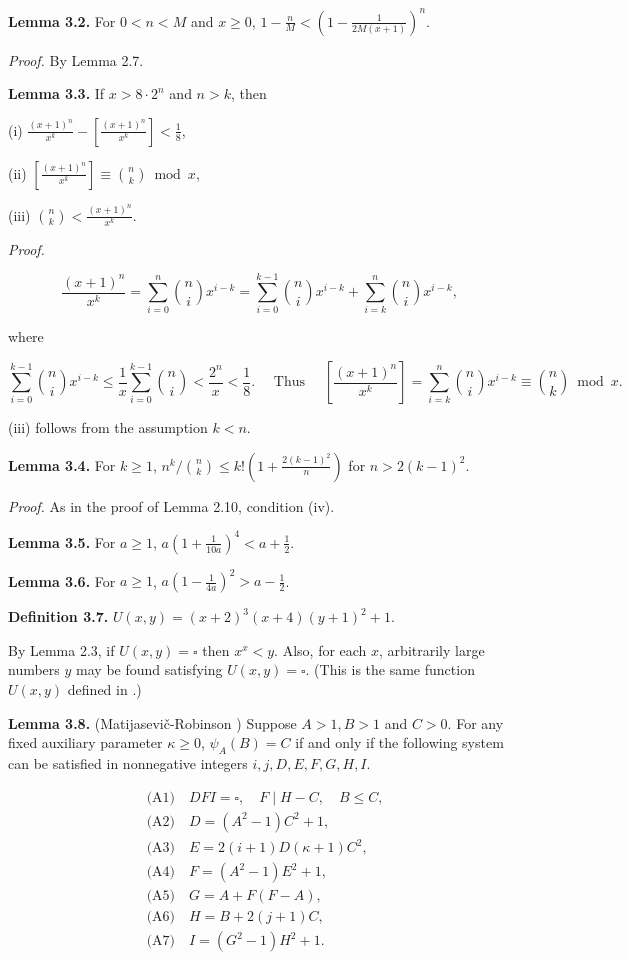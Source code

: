 \documentclass[10pt,letterpaper]{article}
\newcommand{\origpage}[1]{\marginnote{\footnotesize\textbf{[#1]}}}
\newcommand{\statement}[1]{\par\medskip\noindent\textbf{#1}\enspace}
\begin{document}
\statement{Lemma 3.2.} \origpage{456}For $0<n<M$ and $x\geq0$, $1-\frac{n}{M}<\left(1-\frac{1}{2M(x+1)}\right)^n$.

\textit{Proof.} By Lemma 2.7.

\statement{Lemma 3.3.} If $x>8 \cdot 2^{n}$ and $n>k$, then

(i) $\frac{(x+1)^{n}}{x^{k}}-\left[\frac{(x+1)^{n}}{x^{k}}\right]<\frac{1}{8}$,

(ii) $\left[\frac{(x+1)^{n}}{x^{k}}\right] \equiv\binom{n}{k} \bmod x$,

(iii) $\binom{n}{k}<\frac{(x+1)^{n}}{x^{k}}$.

\textit{Proof.}

\[
\frac{(x+1)^{n}}{x^{k}}=\sum_{i=0}^{n}\binom{n}{i} x^{i-k}=\sum_{i=0}^{k-1}\binom{n}{i} x^{i-k}+\sum_{i=k}^{n}\binom{n}{i} x^{i-k},
\]

where

\[
\sum_{i=0}^{k-1}\binom{n}{i} x^{i-k} \leq \frac{1}{x} \sum_{i=0}^{k-1}\binom{n}{i}<\frac{2^{n}}{x}<\frac{1}{8} . \quad \text { Thus } \quad\left[\frac{(x+1)^{n}}{x^{k}}\right]=\sum_{i=k}^{n}\binom{n}{i} x^{i-k} \equiv\binom{n}{k} \bmod x .
\]

(iii) follows from the assumption $k<n$.

\statement{Lemma 3.4.} For $k\geq1$, $n^{k} /\binom{n}{k} \leq k!\left(1+\frac{2(k-1)^{2}}{n}\right)$ for $n>2(k-1)^{2}$.

\textit{Proof.} As in the proof of Lemma 2.10, condition (iv).

\statement{Lemma 3.5.} For $a\geq1$, $a\left(1+\frac{1}{10a}\right)^4<a+\frac12$.

\statement{Lemma 3.6.} For $a\geq1$, $a\left(1-\frac{1}{4a}\right)^2>a-\frac12$.

\statement{Definition 3.7.} $U(x, y)=(x+2)^{3}(x+4)(y+1)^{2}+1$.

By Lemma 2.3, if $U(x, y)=\square$ then $x^{x}<y$. Also, for each $x$, arbitrarily large numbers $y$ may be found satisfying $U(x, y)=\square$. (This is the same function $U(x, y)$ defined in \cite{ref11}.)

\statement{Lemma 3.8.} (Matijasevič-Robinson \cite{ref11}) Suppose $A>1, B>1$ and $C>0$. For any fixed auxiliary parameter $\kappa\geq0$, $\psi_A(B)=C$ if and only if the following system can be satisfied in nonnegative integers $i,j,D,E,F,G,H,I$.

\begin{align*}
&\text{(A1)}\quad DFI=\square,\quad F\mid H-C,\quad B\leq C,\\
&\text{(A2)}\quad D=(A^2-1)C^2+1,\\
&\text{(A3)}\quad E=2(i+1)D(\kappa+1)C^2,\\
&\text{(A4)}\quad F=(A^2-1)E^2+1,\\
&\text{(A5)}\quad G=A+F(F-A),\\
&\text{(A6)}\quad H=B+2(j+1)C,\\
&\text{(A7)}\quad I=(G^2-1)H^2+1.
\end{align*}
\end{document}
